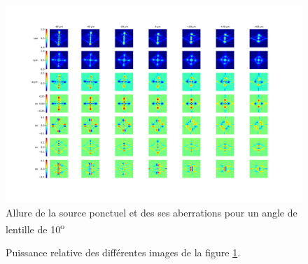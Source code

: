 \documentclass[11pt,letterpaper]{article}
\begin{document}
\begin{figure}[H]
    \centering
    \includegraphics[scale=0.3]{test26_psm.jpg}
    \caption{Allure de la source ponctuel et des ses aberrations pour un angle de lentille de 10\textsuperscript{o}}
    \label{test27}
\end{figure}
\begin{figure}[H]
    \centering
{}

\caption{Puissance relative des différentes images de la figure \ref{test27}.}
\label{fig4}
\end{figure}
\end{document}
